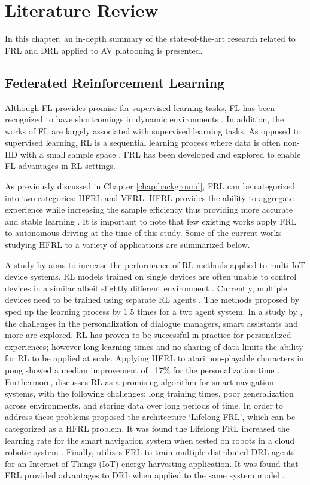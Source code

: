 \chapter{Literature Review} \label{chap:litreview}
In this chapter, an in-depth summary of the state-of-the-art research related to
FRL and DRL applied to AV platooning is presented.

\section{Federated Reinforcement Learning}
Although FL provides promise for supervised learning tasks, FL has been recognized to have
shortcomings in dynamic environments \cite{Li2020a}.   In addition, the works of FL
are largely associated with supervised learning tasks. As opposed to supervised learning,
RL is a sequential learning process where data is often non-IID with a small sample space
\cite{Zhuo2019, sutton2018reinforcement}. FRL has been developed and explored to enable FL advantages
in RL settings.

As previously discussed in Chapter \ref{chap:background}, FRL can be categorized into two categories: HFRL and VFRL.
HFRL provides the ability to aggregate experience while increasing the sample efficiency thus
providing more accurate and stable learning  \cite{IntelAI19}.
It is important to note that few existing works apply
FRL to autonomous driving at the time of this study.  Some of the current works studying
HFRL to a variety of applications are summarized below.

A study by \cite{Lim2020} aims to increase the performance of RL methods applied to
multi-IoT device systems.  RL models trained on single devices are often unable to control
devices in a similar albeit slightly different environment \cite{Lim2020}.  Currently,
multiple devices need to be trained using separate RL agents \cite{Lim2020}. The methods
proposed by \cite{Lim2020} sped up the learning process by 1.5 times for a two agent system.
In a study by \cite{Nadiger2019}, the challenges in the personalization of dialogue
managers, smart assistants and more are explored.  RL has proven to be successful in
practice for personalized experiences; however long learning times and no sharing of data
limits the ability for RL to be applied at scale.  Applying HFRL to atari non-playable
characters in pong showed a median improvement of ~17\% for the personalization time
\cite{Nadiger2019}. Furthermore, \cite{Liu2019b} discusses RL as a promising algorithm for
smart navigation systems, with the following challenges: long training times, poor
generalization across environments, and storing data over long periods of time.  In order
to address these problems \cite{Liu2019b} proposed the architecture `Lifelong FRL',
which can be categorized as a HFRL problem.  It was found the Lifelong FRL increased
the learning rate for the smart navigation system when tested on robots in a cloud
robotic system \cite{Liu2019b}. Finally, \cite{Ren2019} utilizes FRL to train multiple distributed
DRL agents for an Internet of Things (IoT) energy harvesting application.  It was found that FRL
provided advantages to DRL when applied to the same system model \cite{Ren2019}.


